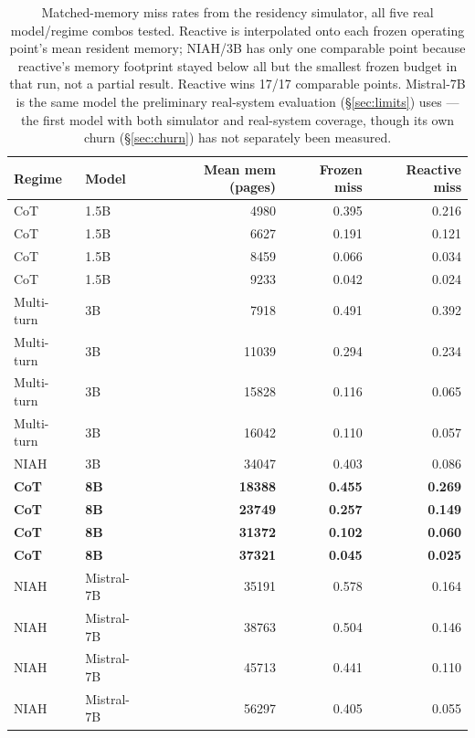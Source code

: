 \documentclass[11pt]{article}
\begin{document}
\begin{table}[t]
\centering
\small
\begin{tabular}{llrrr}
\toprule
Regime & Model & Mean mem (pages) & Frozen miss & Reactive miss \\
\midrule
CoT       & 1.5B & 4980 & 0.395 & 0.216 \\
CoT       & 1.5B & 6627 & 0.191 & 0.121 \\
CoT       & 1.5B & 8459 & 0.066 & 0.034 \\
CoT       & 1.5B & 9233 & 0.042 & 0.024 \\
\midrule
Multi-turn & 3B & 7918  & 0.491 & 0.392 \\
Multi-turn & 3B & 11039 & 0.294 & 0.234 \\
Multi-turn & 3B & 15828 & 0.116 & 0.065 \\
Multi-turn & 3B & 16042 & 0.110 & 0.057 \\
\midrule
NIAH & 3B & 34047 & 0.403 & 0.086 \\
\midrule
\textbf{CoT} & \textbf{8B} & \textbf{18388} & \textbf{0.455} & \textbf{0.269} \\
\textbf{CoT} & \textbf{8B} & \textbf{23749} & \textbf{0.257} & \textbf{0.149} \\
\textbf{CoT} & \textbf{8B} & \textbf{31372} & \textbf{0.102} & \textbf{0.060} \\
\textbf{CoT} & \textbf{8B} & \textbf{37321} & \textbf{0.045} & \textbf{0.025} \\
\midrule
NIAH & Mistral-7B & 35191 & 0.578 & 0.164 \\
NIAH & Mistral-7B & 38763 & 0.504 & 0.146 \\
NIAH & Mistral-7B & 45713 & 0.441 & 0.110 \\
NIAH & Mistral-7B & 56297 & 0.405 & 0.055 \\
\bottomrule
\end{tabular}
\caption{Matched-memory miss rates from the residency simulator, all
five real model/regime combos tested. Reactive is interpolated onto
each frozen operating point's mean resident memory; NIAH/3B has only
one comparable point because reactive's memory footprint stayed below
all but the smallest frozen budget in that run, not a partial result.
Reactive wins 17/17 comparable points. Mistral-7B is the same model
the preliminary real-system evaluation (\S\ref{sec:limits}) uses ---
the first model with both simulator and real-system coverage, though
its own churn (\S\ref{sec:churn}) has not separately been measured.}
\label{tab:sim}
\end{table}
\end{document}
